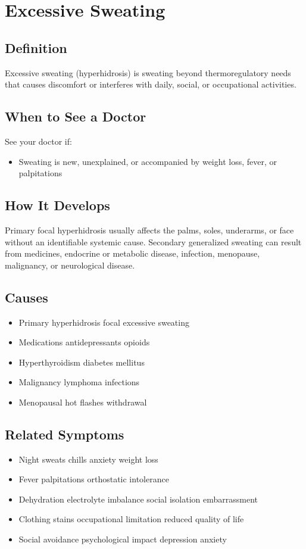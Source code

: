 \chapter{Excessive Sweating}

\section*{Definition}
Excessive sweating (hyperhidrosis) is sweating beyond thermoregulatory needs that causes discomfort or interferes with daily, social, or occupational activities.

\section*{When to See a Doctor}
See your doctor if:
\begin{itemize}
  \item Sweating is new, unexplained, or accompanied by weight loss, fever, or palpitations
\end{itemize}

\section*{How It Develops}
Primary focal hyperhidrosis usually affects the palms, soles, underarms, or face without an identifiable systemic cause. Secondary generalized sweating can result from medicines, endocrine or metabolic disease, infection, menopause, malignancy, or neurological disease.

\section*{Causes}
\begin{itemize}
  \item Primary hyperhidrosis focal excessive sweating
  \item Medications antidepressants opioids
  \item Hyperthyroidism diabetes mellitus
  \item Malignancy lymphoma infections
  \item Menopausal hot flashes withdrawal
\end{itemize}

\section*{Related Symptoms}
\begin{itemize}
  \item Night sweats chills anxiety weight loss
  \item Fever palpitations orthostatic intolerance
  \item Dehydration electrolyte imbalance social isolation embarrassment
  \item Clothing stains occupational limitation reduced quality of life
  \item Social avoidance psychological impact depression anxiety
\end{itemize}

